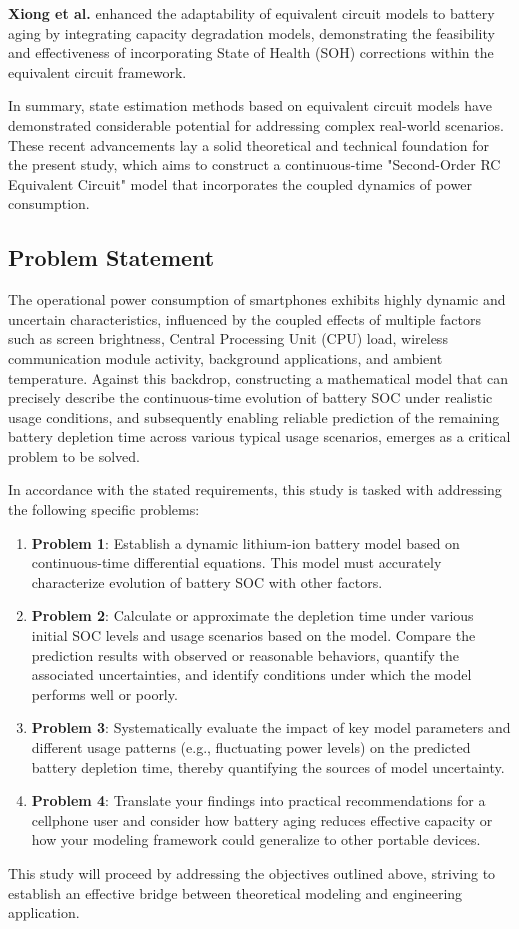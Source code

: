 \textbf{Xiong et al.} \cite{Xiong2021} enhanced the adaptability of equivalent circuit models to battery aging 
by integrating capacity degradation models, demonstrating the feasibility and effectiveness of incorporating State of Health 
(SOH) corrections within the equivalent circuit framework.

In summary, state estimation methods based on equivalent circuit models have demonstrated considerable potential 
for addressing complex real-world scenarios. These recent advancements lay a solid theoretical and technical foundation 
for the present study, which aims to construct a continuous-time "Second-Order RC Equivalent Circuit" model that incorporates 
the coupled dynamics of power consumption.

\subsection{Problem Statement}
The operational power consumption of smartphones exhibits highly dynamic and uncertain characteristics, influenced by the coupled effects of multiple factors such as screen brightness, Central Processing Unit (CPU) load, wireless communication module activity, background applications, and ambient temperature. Against this backdrop, constructing a mathematical model that can precisely describe the continuous-time evolution of battery SOC under realistic usage conditions, and subsequently enabling reliable prediction of the remaining battery depletion time across various typical usage scenarios, emerges as a critical problem to be solved.

In accordance with the stated requirements, this study is tasked with addressing the following specific problems:
\begin{enumerate}
    \item \textbf{Problem 1}: Establish a dynamic lithium-ion battery model based on continuous-time differential equations. 
    This model must accurately characterize evolution of battery SOC with other factors.
    \item \textbf{Problem 2}: Calculate or approximate the depletion time under various initial SOC levels and usage scenarios 
    based on the model. Compare the prediction results with observed or reasonable behaviors, quantify the associated uncertainties, 
    and identify conditions under which the model performs well or poorly.
    \item \textbf{Problem 3}: Systematically evaluate the impact of key model parameters and different usage patterns (e.g., fluctuating power levels) on the predicted battery depletion time, 
    thereby quantifying the sources of model uncertainty.
    \item \textbf{Problem 4}: Translate your findings into practical recommendations for a cellphone user and 
    consider how battery aging reduces effective capacity or how your modeling framework could generalize to other portable devices.
\end{enumerate}

This study will proceed by addressing the objectives outlined above, striving to establish an effective bridge between theoretical 
modeling and engineering application.